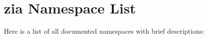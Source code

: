 \section{zia Namespace List}
Here is a list of all documented namespaces with brief descriptions:\begin{CompactList}
\item{}
\end{CompactList}
